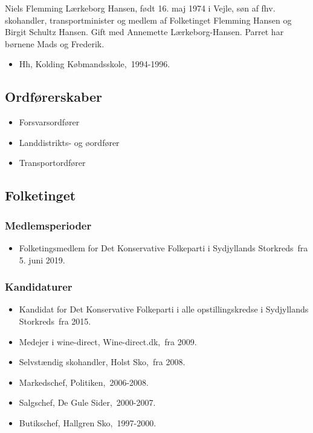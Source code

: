 \documentclass[11pt, a4paper]{awesome-cv}
\begin{document}
\makecvheader[R]
\makelettertitle
\begin{cvletter}
Niels Flemming Lærkeborg Hansen, født 16. maj 1974 i Vejle, søn af fhv. skohandler, transportminister og medlem af Folketinget Flemming Hansen og Birgit Schultz Hansen. Gift med Annemette Lærkeborg-Hansen. Parret har børnene Mads og Frederik.

\begin{itemize}
\item Hh, Kolding Købmandsskole, 1994-1996.
\end{itemize}
\subsection*{Ordførerskaber}
\begin{itemize}
\item Forsvarsordfører
\item Landdistrikts- og øordfører
\item Transportordfører
\end{itemize}
\subsection*{Folketinget}
\subsubsection*{Medlemsperioder}
\begin{itemize}
\item Folketingsmedlem for Det Konservative Folkeparti i Sydjyllands Storkreds fra 5. juni 2019.
\end{itemize}
\subsubsection*{Kandidaturer}
\begin{itemize}
\item Kandidat for Det Konservative Folkeparti i alle opstillingskredse i Sydjyllands Storkreds fra 2015.
\end{itemize}
\begin{itemize}
\item Medejer i wine-direct, Wine-direct.dk, fra 2009.
\item Selvstændig skohandler, Holst Sko, fra 2008.
\item Markedschef, Politiken, 2006-2008.
\item Salgschef, De Gule Sider, 2000-2007.
\item Butikschef, Hallgren Sko, 1997-2000.
\end{itemize}
\end{cvletter}
\end{document}
